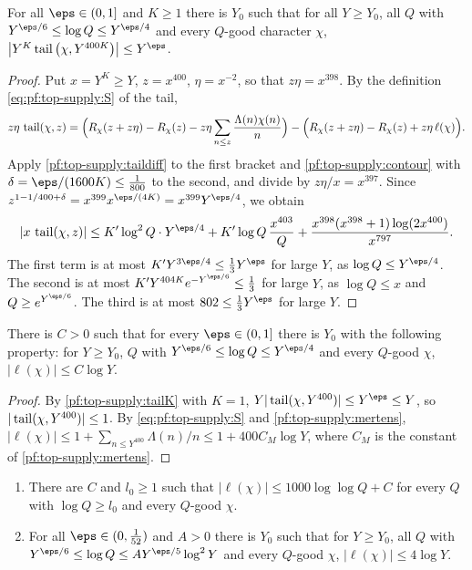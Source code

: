 \begin{lemma}\label{pf:top-supply:tailK}
For all $\eps\in(0,1]$ and $K\ge1$ there is $Y_0$ such that for all $Y\ge Y_0$, all $Q$ with
$Y^{\eps/6}\le\log Q\le Y^{\eps/4}$ and every $Q$-good character $\chi$,
$\big|Y^K\topsupplytail\big(\chi,Y^{400K}\big)\big|\le Y^\eps$.
\end{lemma}

\begin{proof}
Put $x=Y^K\ge Y$, $z=x^{400}$, $\eta=x^{-2}$, so that $z\eta=x^{398}$. By the definition
\eqref{eq:pf:top-supply:S} of the tail,
\[
z\eta\,\operatorname{tail}(\chi,z)=\Big(R_\chi(z+z\eta)-R_\chi(z)-z\eta\sum_{n\le z}\frac{\Lambda(n)\chi(n)}n\Big)
-\Big(R_\chi(z+z\eta)-R_\chi(z)+z\eta\,\ell(\chi)\Big).
\]
Apply \cref{pf:top-supply:taildiff} to the first bracket and \cref{pf:top-supply:contour} with
$\delta=\eps/(1600K)\le\frac1{800}$ to the second, and divide by $z\eta/x=x^{397}$. Since
$z^{1-1/400+\delta}=x^{399}x^{\eps/(4K)}=x^{399}Y^{\eps/4}$, we obtain
\[
|x\,\topsupplytail(\chi,z)|\le K'\log^2Q\cdot Y^{\eps/4}+K'\log Q\,\frac{x^{403}}Q+\frac{x^{398}(x^{398}+1)\log(2x^{400})}{x^{797}}.
\]
The first term is at most $K'Y^{3\eps/4}\le\frac13Y^\eps$ for large $Y$, as $\log Q\le Y^{\eps/4}$. The second is at
most $K'Y^{404K}e^{-Y^{\eps/6}}\le\frac13$ for large $Y$, as $\log Q\le x$ and $Q\ge e^{Y^{\eps/6}}$. The third is
at most $802\le\frac13Y^\eps$ for large $Y$.
\end{proof}

\begin{lemma}\label{pf:top-supply:kappaC}
There is $C>0$ such that for every $\eps\in(0,1]$ there is $Y_0$ with the following property: for $Y\ge Y_0$, $Q$
with $Y^{\eps/6}\le\log Q\le Y^{\eps/4}$ and every $Q$-good $\chi$, $|\ell(\chi)|\le C\log Y$.
\end{lemma}

\begin{proof}
By \cref{pf:top-supply:tailK} with $K=1$, $Y|\topsupplytail(\chi,Y^{400})|\le Y^\eps\le Y$, so
$|\operatorname{tail}(\chi,Y^{400})|\le1$. By \eqref{eq:pf:top-supply:S} and \cref{pf:top-supply:mertens},
$|\ell(\chi)|\le1+\sum_{n\le Y^{400}}\Lambda(n)/n\le1+400C_M\log Y$, where $C_M$ is the constant of
\cref{pf:top-supply:mertens}.
\end{proof}

\begin{lemma}\label{pf:top-supply:kappa4}
\begin{enumerate}[label=(\roman*)]
\item There are $C$ and $l_0\ge1$ such that $|\ell(\chi)|\le1000\log\log Q+C$ for every $Q$ with $\log Q\ge l_0$ and
every $Q$-good $\chi$.
\item For all $\eps\in(0,\frac1{52})$ and $A>0$ there is $Y_0$ such that for $Y\ge Y_0$, all $Q$ with
$Y^{\eps/6}\le\log Q\le AY^{\eps/5}\log^2Y$ and every $Q$-good $\chi$, $|\ell(\chi)|\le4\log Y$.
\end{enumerate}
 
\end{lemma}

